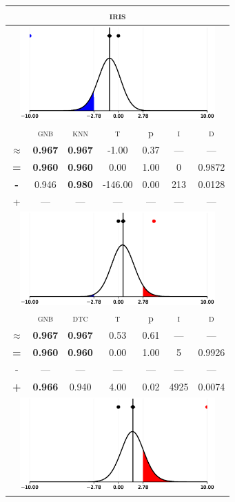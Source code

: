 \begin{tabular}{c||cc||c|c|c||c}
	\toprule
	\multicolumn{7}{c}{\textsc{iris}}\\
	\bottomrule
	\multicolumn{7}{c}{\includegraphics[width=7.5cm, trim=30 0 30 0]{figures/iris_0.eps}}\\

\midrule	&\textsc{gnb} & \textsc{knn} & \textsc{t} & p & \textsc{i} & \textsc{d}\\
	\color{black} $\approx$ & \color{black} \bfseries 0.967 &\color{black}  \bfseries 0.967 & -1.00 & 0.37 & --- & ---\\\midrule
	{\bfseries\color{black}\tiny=}& \color{black} \bfseries 0.960 & \color{black} \bfseries 0.960 & 0.00 & 1.00 & 0 & \color{black} 0.9872\\
	{\bfseries\color{blue}\tiny-}& \color{blue}  0.946 & \color{blue} \bfseries 0.980 & -146.00 & 0.00 & 213 & \color{blue} 0.0128\\
	{\tiny+}& --- & --- & --- & --- & --- & ---\\
	\bottomrule
	\multicolumn{7}{c}{\includegraphics[width=7.5cm, trim=30 0 30 0]{figures/iris_1.eps}}\\

\midrule	&\textsc{gnb} & \textsc{dtc} & \textsc{t} & p & \textsc{i} & \textsc{d}\\
	\color{black} $\approx$ & \color{black} \bfseries 0.967 &\color{black}  \bfseries 0.967 & 0.53 & 0.61 & --- & ---\\\midrule
	{\bfseries\color{black}\tiny=}& \color{black} \bfseries 0.960 & \color{black} \bfseries 0.960 & 0.00 & 1.00 & 5 & \color{black} 0.9926\\
	{\tiny-}& --- & --- & --- & --- & --- & ---\\
	{\bfseries\color{red}\tiny+}& \color{red} \bfseries 0.966 & \color{red}  0.940 & 4.00 & 0.02 & 4925 & \color{red} 0.0074\\
	\bottomrule
	\multicolumn{7}{c}{\includegraphics[width=7.5cm, trim=30 0 30 0]{figures/iris_2.eps}}\\


\end{tabular}
